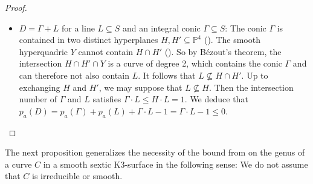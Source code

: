 \documentclass[english,11pt,reqno]{amsart}
\newcommand{\sub}{\subseteq}
\newcommand{\Pfour}{\mathbb{P}^4}
\begin{document}
\begin{proof}
\begin{itemize}
The second possibility to have $L_i\cdot L_j = 1$ for all $i,j\in\{1,2,3\}$ with $i\neq j$ is that $L_1, L_2$ and $L_3$ intersect in 3 distinct points $p_1,p_2,p_3\in S$. Consider a plane $H\cap H'$ through $p_1,p_2$ and $p_3$ that is given as an intersection of two hyperplanes $H,H'\sub \Pfour$. Since two points of the set $\{p_1,p_2,p_3\}\sub H\cap H'$ are contained in $L_i$, we apply Bézout's theorem to deduce that $L_i \sub H\cap H'$ for all $i\in\{1,2,3\}$. As the smooth hyperquadric $Y$ cannot contain the plane $H\cap H'$ (), we can again use Bézout's theorem to argue that $H\cdot H' \cdot Y\leq 2$. However, this contradicts the fact that $L_1\cup L_2 \cup L_3 \sub H \cap H' \cap Y$. \par
We have thus indeed shown that $L_1\cdot L_2 + L_1\cdot L_3 + L_2\cdot L_3 \leq 2$.
We conclude $$p_a(D)= p_a(L_1)+p_a(L_2)+p_a(L_3) + L_1\cdot L_2 + L_1\cdot L_3 + L_2 \cdot L_3-2\leq 2 -2 =0.$$ 
\item $D=\Gamma + L$ for a line $L\sub S$ and an integral conic $\Gamma \sub S$: The conic $\Gamma$ is contained in two distinct hyperplanes $H, H'\sub \Pfour$ (). The smooth hyperquadric $Y$ cannot contain $H\cap H'$ (). So by Bézout's theorem, the intersection $H\cap H' \cap Y$ is a curve of degree 2, which contains the conic $\Gamma$ and can therefore not also contain $L$. It follows that $L\not \sub H\cap H'$. Up to exchanging $H$ and $H'$, we may suppose that $L\not \sub H$.  Then the intersection number of $\Gamma$ and $L$ satisfies $\Gamma \cdot L \leq H \cdot L = 1$. We deduce that $p_a(D)=p_a(\Gamma)+p_a(L)+\Gamma \cdot L-1=\Gamma \cdot L -1\leq 0
$.
\end{itemize}
\end{proof}
%
The next proposition generalizes the necessity of the bound from  on the genus of a curve $C$ in a smooth sextic K3-surface in the following sense: We do not assume that $C$ is irreducible or smooth.
%
%
\end{document}
